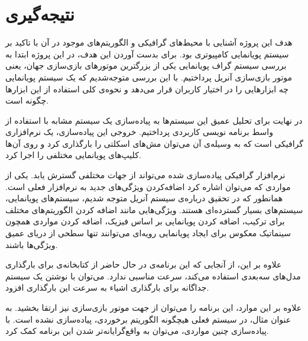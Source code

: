 \chapter {نتیجه‌گیری }

هدف این پروژه آشنایی با محیط‌های گرافیکی و الگوریتم‌های موجود در آن با 
تاکید بر سیستم پویانمایی کامپیوتری بود.
برای بدست آوردن این هدف، در این پروژه ابتدا به بررسی سیستم گراف 
پویانمایی یکی از بزرگترین موتور‌های بازی‌سازی جهان، یعنی موتور بازی‌سازی آنریل 
پرداختیم.
با این بررسی متوجه‌‌شدیم که یک سیستم پویانمایی چه ابزارهایی را در اختیار کاربران 
قرار می‌دهد و نحوه‌ی کلی استفاده از این ابزار‌ها چگونه است.

در نهایت برای تحلیل عمیق این سیستم‌ها به پیاده‌سازی یک سیستم مشابه 
با استفاده از واسط برنامه نویسی کاربردی 
پرداختیم.
خروجی این پیاده‌سازی، یک نرم‌افزاری گرافیکی است که به وسیله‌ی آن 
می‌توان مش‌های اسکلتی را بارگذاری کرد و روی آن‌ها کلیپ‌های 
پویانمایی مختلفی را اجرا کرد.

نرم‌افزار گرافیکی پیاده‌سازی شده می‌تواند از جهات مختلفی گسترش یابد.
 یکی از مواردی که می‌توان اشاره کرد 
اضافه‌کردن ویژگی‌های جدید به نرم‌افزار فعلی است. همانطور که در تحقیق درباره‌ی سیستم آنریل متوجه‌ شدیم، سیستم‌‌های پویانمایی،
سیستم‌‌های بسیار گسترده‌ای هستند. ویژگی‌هایی مانند اضافه کردن الگوریتم‌های مختلف برای ترکیب،
اضافه کردن پویانمایی بر اساس فیزیک، اضافه کردن 
مواردی همچون سینماتیک معکوس برای ایجاد پویانمایی رویه‌ای می‌توانند تنها سطحی از دریای عمیق ویژگی‌ها باشند.

علاوه بر این، از آنجایی که این برنامه‌ی در حال حاضر از کتابخانه‌ی 
برای بارگذاری مدل‌های سه‌بعدی استفاده می‌کند، سرعت مناسبی ندارد.
می‌توان با نوشتن یک سیستم جداگانه برای بارگذاری اشیاء به سرعت این بارگذاری افزود.

علاوه بر این موارد، این برنامه را می‌توان از جهت موتور بازی‌سازی نیز ارتقا بخشید.
به عنوان مثال، در سیستم فعلی هیچگونه الگوریتم برخوردی، پیاده‌سازی نشده است. با پیاده‌سازی چنین مواردی،
می‌توان به واقع‌گرایانه‌تر شدن این برنامه کمک کرد.

